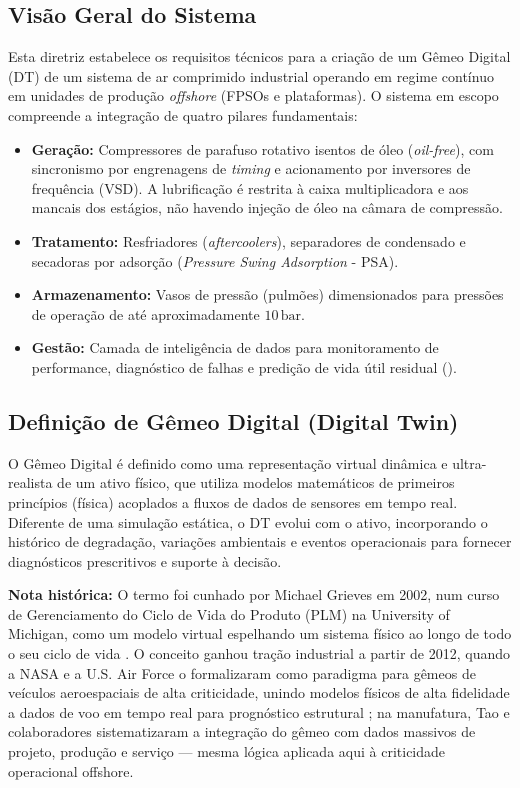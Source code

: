 \documentclass[12pt,a4paper]{article}
\numberwithin{equation}{section}
\numberwithin{table}{section}
\numberwithin{figure}{section}
\begin{document}
	\subsection{\textbf{Visão Geral do Sistema}}
	Esta diretriz estabelece os requisitos técnicos para a criação de um Gêmeo Digital (DT) de um sistema de ar comprimido industrial operando em regime contínuo em unidades de produção \textit{offshore} (FPSOs e plataformas). O sistema em escopo compreende a integração de quatro pilares fundamentais:
	
	\begin{itemize}
		\item \textbf{Geração:} Compressores de parafuso rotativo isentos de óleo (\textit{oil-free}), com sincronismo por engrenagens de \textit{timing} e acionamento por inversores de frequência (VSD). A lubrificação é restrita à caixa multiplicadora e aos mancais dos estágios, não havendo injeção de óleo na câmara de compressão.
		\item \textbf{Tratamento:} Resfriadores (\textit{aftercoolers}), separadores de condensado e secadoras por adsorção (\textit{Pressure Swing Adsorption} - PSA).
		\item \textbf{Armazenamento:} Vasos de pressão (pulmões) dimensionados para pressões de operação de até aproximadamente $10\,\text{bar}$.
		\item \textbf{Gestão:} Camada de inteligência de dados para monitoramento de performance, diagnóstico de falhas e predição de vida útil residual ().
	\end{itemize}
	
	\subsection{\textbf{Definição de Gêmeo Digital (Digital Twin)}}
	O Gêmeo Digital é definido como uma representação virtual dinâmica e ultra-realista de um ativo físico, que utiliza modelos matemáticos de primeiros princípios (física) acoplados a fluxos de dados de sensores em tempo real. Diferente de uma simulação estática, o DT evolui com o ativo, incorporando o histórico de degradação, variações ambientais e eventos operacionais para fornecer diagnósticos prescritivos e suporte à decisão.

	\textbf{Nota histórica:} O termo foi cunhado por Michael Grieves em 2002, num curso de Gerenciamento do Ciclo de Vida do Produto (PLM) na University of Michigan, como um modelo virtual espelhando um sistema físico ao longo de todo o seu ciclo de vida \cite{grieves}. O conceito ganhou tração industrial a partir de 2012, quando a NASA e a U.S. Air Force o formalizaram como paradigma para gêmeos de veículos aeroespaciais de alta criticidade, unindo modelos físicos de alta fidelidade a dados de voo em tempo real para prognóstico estrutural \cite{glaessgen}; na manufatura, Tao e colaboradores sistematizaram a integração do gêmeo com dados massivos de projeto, produção e serviço \cite{tao} — mesma lógica aplicada aqui à criticidade operacional offshore.
\end{document}

